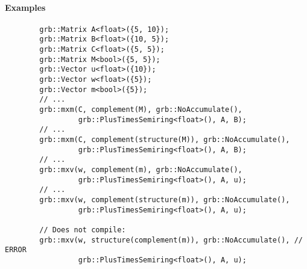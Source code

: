 \paragraph{Examples}

\begin{verbatim}
        grb::Matrix A<float>({5, 10});
        grb::Matrix B<float>({10, 5});
        grb::Matrix C<float>({5, 5});
        grb::Matrix M<bool>({5, 5});
        grb::Vector u<float>({10});
        grb::Vector w<float>({5});
        grb::Vector m<bool>({5});
        // ...
        grb::mxm(C, complement(M), grb::NoAccumulate(), 
                 grb::PlusTimesSemiring<float>(), A, B);
        // ...
        grb::mxm(C, complement(structure(M)), grb::NoAccumulate(), 
                 grb::PlusTimesSemiring<float>(), A, B);
        // ...
        grb::mxv(w, complement(m), grb::NoAccumulate(), 
                 grb::PlusTimesSemiring<float>(), A, u);
        // ...
        grb::mxv(w, complement(structure(m)), grb::NoAccumulate(), 
                 grb::PlusTimesSemiring<float>(), A, u);

        // Does not compile:
        grb::mxv(w, structure(complement(m)), grb::NoAccumulate(), // ERROR
                 grb::PlusTimesSemiring<float>(), A, u);
\end{verbatim}
